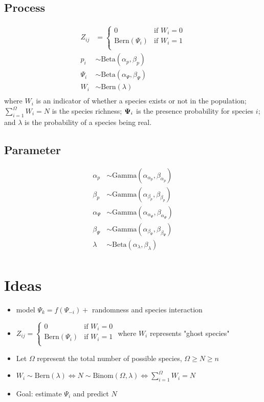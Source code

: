 \documentclass[fleqn]{article}
\def\bm#1{\mbox{\boldmath $#1$}}
\begin{document}
\subsection{Process}
%
\begin{align*}
  Z_{ij} & = 
  \begin{cases}
    0 & \mbox{if } W_i = 0\\
    \mbox{Bern}(\Psi_i) & \mbox{if } W_i = 1\\
  \end{cases}\\
  p_i & \sim \mbox{Beta}(\alpha_p, \beta_p)\\
  \Psi_i & \sim \mbox{Beta}(\alpha_\Psi, \beta_\Psi)\\
  W_i & \sim \mbox{Bern}(\lambda)\\
\end{align*}
%
where $W_i$ is an indicator of whether a species exists or not in the population;  $\sum_{i = 1}^\Omega W_i = N$ is the species richness; $\bm{\Psi}_i$ is the presence probability for species $i$; and $\lambda$ is the probability of a species being real. 
%
\subsection{Parameter}
%
\begin{align*}
  \alpha_p & \sim \mbox{Gamma}(\alpha_{\alpha_p}, \beta_{\alpha_p})\\
  \beta_p & \sim \mbox{Gamma}(\alpha_{\beta_p}, \beta_{\beta_p})\\
  \alpha_\Psi & \sim \mbox{Gamma}(\alpha_{\alpha_\Psi}, \beta_{\alpha_\Psi})\\
  \beta_\Psi & \sim \mbox{Gamma}(\alpha_{\beta_\Psi}, \beta_{\beta_\Psi})\\
  \lambda & \sim \mbox{Beta}(\alpha_\lambda, \beta_\lambda)\\
\end{align*}
%
\section{Ideas}
%
\begin{itemize}
  \item model $\Psi_k = f(\Psi_{ - i}) +$ randomness and species interaction
  \item $
  Z_{ij}  = 
  \begin{cases}
    0 & \mbox{if } W_i = 0\\
    \mbox{Bern}(\Psi_i) & \mbox{if } W_i = 1\\
  \end{cases}$ where $W_i$ represents "ghost species"
  \item Let $\Omega$ represent the total number of possible species, $\Omega \geq N \geq n$
  \item $W_i \sim \mbox{Bern}(\lambda) \Leftrightarrow N \sim \mbox{Binom}(\Omega, \lambda) \Leftrightarrow \sum_{i = 1}^\Omega W_i = N$
  \item Goal: estimate $\Psi_i$ and predict $N$
\end{itemize}
%
\end{document}
